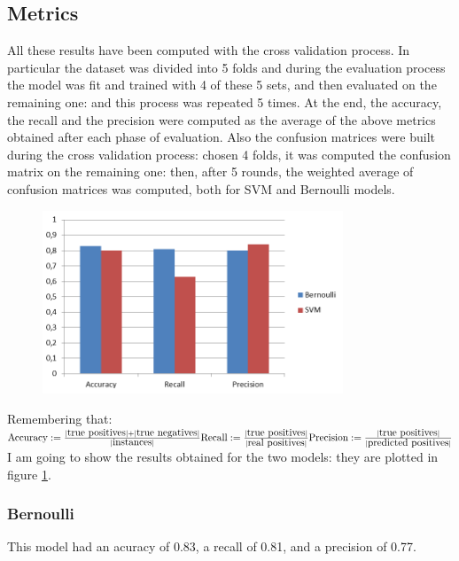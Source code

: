 \documentclass[12pt]{article}
\begin{document}
\subsection{Metrics}
All these results have been computed with the cross validation process. In particular the dataset was divided into 5 folds and during the evaluation process the model was fit and trained with 4 of these 5 sets, and then evaluated on the remaining one: and this process was repeated 5 times. At the end, the accuracy, the recall and the precision were computed as the average of the above metrics obtained after each phase of evaluation. Also the confusion matrices were built during the cross validation process: chosen 4 folds, it was computed the confusion matrix on the remaining one: then, after 5 rounds, the weighted average of confusion matrices was computed, both for SVM and Bernoulli models.
\begin{figure}[!ht]
	\centering %
	\includegraphics[width=0.8\textwidth]{metrics.png} %
	\caption{} 
	\label{fig:metrics}
\end{figure}
Remembering that:
$
\newline\newline
\mbox{Accuracy}:= \frac{|\mbox{true positives}| + |\mbox{true negatives}|}{|\mbox{instances}|}
\newline\newline
\mbox{Recall}:= \frac{|\mbox{true positives}|}{|\mbox{real positives}|}
\newline\newline
\mbox{Precision}:= \frac{|\mbox{true positives}|}{|\mbox{predicted positives}|}
\newline\newline
$
I am going to show the results obtained for the two models: they are plotted in figure \ref{fig:metrics}.

\subsubsection{Bernoulli}
This model had an acuracy of 0.83, a recall of 0.81, and a precision of 0.77.
\end{document}
